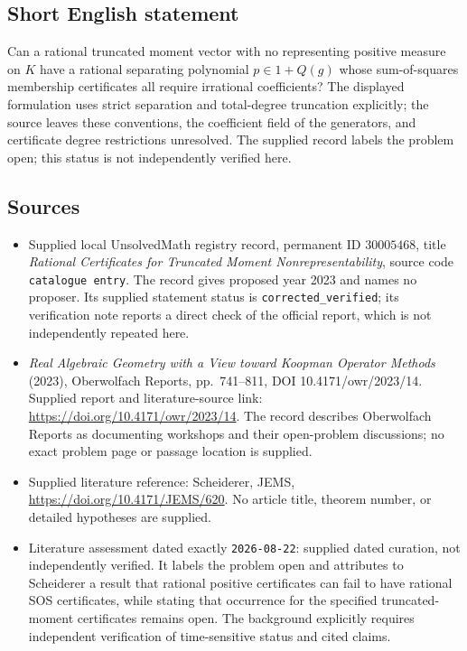 \documentclass[11pt]{article}
\begin{document}
\subsection{Short English statement}
Can a rational truncated moment vector with no representing positive measure on \(K\) have a rational separating polynomial \(p\in1+Q(g)\) whose sum-of-squares membership certificates all require irrational coefficients? The displayed formulation uses strict separation and total-degree truncation explicitly; the source leaves these conventions, the coefficient field of the generators, and certificate degree restrictions unresolved. The supplied record labels the problem open; this status is not independently verified here.
\subsection{Sources}
\begin{itemize}
\item Supplied local UnsolvedMath registry record, permanent ID \(30005468\), title \emph{Rational Certificates for Truncated Moment Nonrepresentability}, source code \texttt{catalogue entry}. The record gives proposed year 2023 and names no proposer. Its supplied statement status is \texttt{corrected\_verified}; its verification note reports a direct check of the official report, which is not independently repeated here.
\item \emph{Real Algebraic Geometry with a View toward Koopman Operator Methods} (2023), Oberwolfach Reports, pp.\ 741--811, DOI 10.4171/owr/2023/14. Supplied report and literature-source link: \url{https://doi.org/10.4171/owr/2023/14}. The record describes Oberwolfach Reports as documenting workshops and their open-problem discussions; no exact problem page or passage location is supplied.
\item Supplied literature reference: Scheiderer, JEMS, \url{https://doi.org/10.4171/JEMS/620}. No article title, theorem number, or detailed hypotheses are supplied.
\item Literature assessment dated exactly \texttt{2026-08-22}: supplied dated curation, not independently verified. It labels the problem open and attributes to Scheiderer a result that rational positive certificates can fail to have rational SOS certificates, while stating that occurrence for the specified truncated-moment certificates remains open. The background explicitly requires independent verification of time-sensitive status and cited claims.
\end{itemize}
\end{document}
